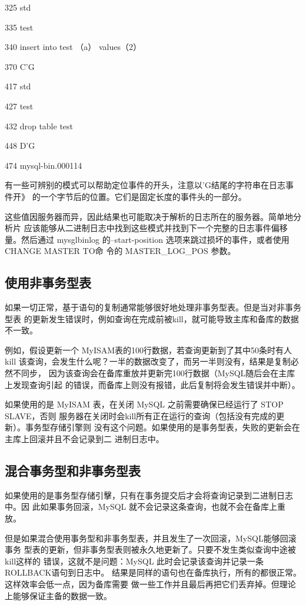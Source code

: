 325 std

335 test

340 insert into test （a） values（2）

370 C'G

417 std

427 test

432 drop table test

448 D'G

474 mysql-bin.000114

有一些可辨别的模式可以帮助定位事件的开头，注意以'G结尾的字符串在日志事件开》
的一个字节后的位置。它们是固定长度的事件头的一部分。

这些值因服务器而异，因此结果也可能取决于解析的日志所在的服务器。简单地分析片
应该能够从二进制日志中找到这些模式并找到下一个完整的日志事件偏移量。然后通过
mysglbinlog 的--start-position 选项来跳过损坏的事件，或者使用 CHANGE MASTER TO命
令的 MASTER\_LOG\_POS 参数。

\subsection{使用非事务型表}
如果一切正常，基于语句的复制通常能够很好地处理非事务型表。但是当对非事务型表
的更新发生错误时，例如查询在完成前被kill，就可能导致主库和备库的数据不一致。

例如，假设更新一个 MyISAM表的100行数据，若查询更新到了其中50条时有人kill
该查询，会发生什么呢？一半的数据改变了，而另一半则没有，结果是复制必然不同步，
因为该查询会在备库重放并更新完100行数据（MySQL随后会在主库上发现查询引起
的错误，而备库上则没有报错，此后复制将会发生错误并中断）。

如果使用的是 MyISAM 表，在关闭 MySQL 之前需要确保已经运行了 STOP SLAVE，否则
服务器在关闭时会kill所有正在运行的查询（包括没有完成的更新）。事务型存储引擎则
没有这个问题。如果使用的是事务型表，失败的更新会在主库上回滚并且不会记录到二
进制日志中。

\subsection{混合事务型和非事务型表}
如果使用的是事务型存储引擊，只有在事务提交后才会将查询记录到二进制日志中。因
此如果事务回滚，MySQL 就不会记录这条查询，也就不会在备库上重放。

但是如果混合使用事务型和非事务型表，并且发生了一次回滚，MySQL能够回滚事务
型表的更新，但非事务型表则被永久地更新了。只要不发生类似查询中途被 kill这样的
错误，这就不是问题：MySQL 此时会记录该查询并记录一条 ROLLBACK语句到日志中。
结果是同样的语句也在备库执行，所有的都很正常。这样效率会低一点，因为备库需要
做一些工作并且最后再把它们丢弃掉。但理论上能够保证主备的数据一致。

